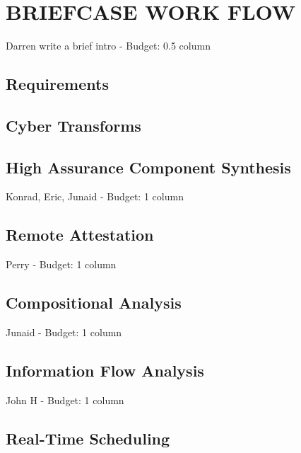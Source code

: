 \documentclass{IEEEcsmag}
\begin{document}
\section{BRIEFCASE WORK FLOW}
Darren write a brief intro -  Budget: 0.5 column
\cite{OSATE}



\subsection{Requirements}


\subsection{Cyber Transforms}


\subsection{High Assurance Component Synthesis}
Konrad, Eric, Junaid -  Budget: 1 column
\cite{case-verified-filter} \cite{hardin-co-assurance}
\cite{formal-filter-synth-langsec} \cite{contiguity-types} 

\subsection{Remote Attestation}
Perry -  Budget: 1 column
\cite{copland-attestation} \cite{copland-verification}

\subsection{Compositional Analysis}
Junaid -  Budget: 1 column


\subsection{Information Flow Analysis}
John H -  Budget: 1 column



\subsection{Real-Time Scheduling}

\end{document}
